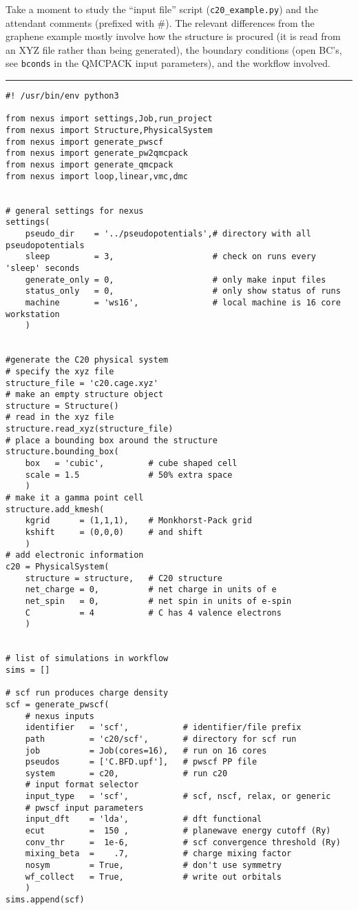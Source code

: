 \documentclass[oneside,11pt]{memoir}
\numberwithin{equation}{section}
\newcommand{\HRule}{\rule{\linewidth}{0.5mm}}
\begin{document}
Take a moment to study the ``input file'' script 
(\texttt{c20\_example.py}) and the attendant comments 
(prefixed with \#). The relevant differences from the graphene example
mostly involve how the structure is procured (it is read from an XYZ file
rather than being generated), the boundary conditions (open BC's, see 
\texttt{bconds} in the QMCPACK input parameters), and the workflow involved. 



\HRule
\begin{verbatim}
#! /usr/bin/env python3

from nexus import settings,Job,run_project
from nexus import Structure,PhysicalSystem
from nexus import generate_pwscf
from nexus import generate_pw2qmcpack
from nexus import generate_qmcpack
from nexus import loop,linear,vmc,dmc


# general settings for nexus
settings(
    pseudo_dir    = '../pseudopotentials',# directory with all pseudopotentials
    sleep         = 3,                    # check on runs every 'sleep' seconds
    generate_only = 0,                    # only make input files
    status_only   = 0,                    # only show status of runs
    machine       = 'ws16',               # local machine is 16 core workstation
    )


#generate the C20 physical system
# specify the xyz file
structure_file = 'c20.cage.xyz'
# make an empty structure object
structure = Structure()
# read in the xyz file
structure.read_xyz(structure_file)
# place a bounding box around the structure
structure.bounding_box(
    box   = 'cubic',         # cube shaped cell
    scale = 1.5              # 50% extra space
    )
# make it a gamma point cell
structure.add_kmesh(
    kgrid      = (1,1,1),    # Monkhorst-Pack grid
    kshift     = (0,0,0)     # and shift
    )
# add electronic information
c20 = PhysicalSystem(
    structure = structure,   # C20 structure
    net_charge = 0,          # net charge in units of e
    net_spin   = 0,          # net spin in units of e-spin
    C          = 4           # C has 4 valence electrons
    ) 


# list of simulations in workflow
sims = []

# scf run produces charge density
scf = generate_pwscf(
    # nexus inputs
    identifier   = 'scf',           # identifier/file prefix
    path         = 'c20/scf',       # directory for scf run
    job          = Job(cores=16),   # run on 16 cores
    pseudos      = ['C.BFD.upf'],   # pwscf PP file
    system       = c20,             # run c20
    # input format selector
    input_type   = 'scf',           # scf, nscf, relax, or generic
    # pwscf input parameters
    input_dft    = 'lda',           # dft functional
    ecut         =  150 ,           # planewave energy cutoff (Ry)
    conv_thr     =  1e-6,           # scf convergence threshold (Ry)
    mixing_beta  =    .7,           # charge mixing factor
    nosym        = True,            # don't use symmetry
    wf_collect   = True,            # write out orbitals
    )
sims.append(scf)  


\end{verbatim}
\end{document}
